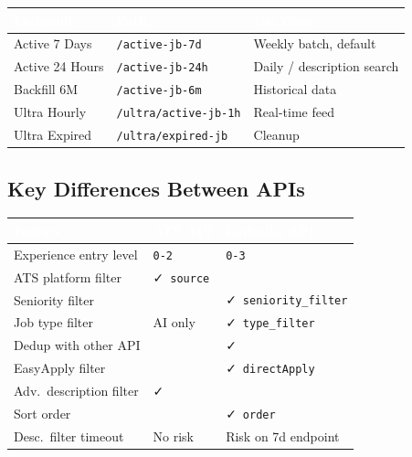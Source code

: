 \documentclass[11pt, a4paper]{article}
\newcommand{\cmark}{\textcolor{success}{\faCheck}}
\newcommand{\xmark}{\textcolor{highlight}{\faTimes}}
\begin{document}
\begin{center}\small
\begin{tabularx}{\textwidth}{|L{3cm}|L{4.5cm}|X|}
\hline
{}
\textcolor{white}{\textbf{Endpoint}} & \textcolor{white}{\textbf{Path}} & \textcolor{white}{\textbf{Use Case}} \\
\hline
Active 7 Days & \texttt{/active-jb-7d} & Weekly batch, default \\
Active 24 Hours & \texttt{/active-jb-24h} & Daily / description search \\
Backfill 6M & \texttt{/active-jb-6m} & Historical data \\
Ultra Hourly & \texttt{/ultra/active-jb-1h} & Real-time feed \\
Ultra Expired & \texttt{/ultra/expired-jb} & Cleanup \\
\hline
\end{tabularx}
\end{center}

\subsection{Key Differences Between APIs}

\begin{center}\small
\begin{tabularx}{\textwidth}{|L{3.8cm}|X|X|}
\hline
{}
\textcolor{white}{\textbf{Feature}} & \textcolor{white}{\textbf{ATS API}} & \textcolor{white}{\textbf{LinkedIn API}} \\
\hline
Experience entry level & \texttt{0-2} & \texttt{0-3} \\
ATS platform filter & \cmark~\texttt{source} & \xmark \\
Seniority filter & \xmark & \cmark~\texttt{seniority\_filter} \\
Job type filter & AI only & \cmark~\texttt{type\_filter} \\
Dedup with other API & \xmark & \cmark \\
EasyApply filter & \xmark & \cmark~\texttt{directApply} \\
Adv.\ description filter & \cmark & \xmark \\
Sort order & \xmark & \cmark~\texttt{order} \\
Desc.\ filter timeout & No risk & Risk on 7d endpoint \\
\hline
\end{tabularx}
\end{center}
\end{document}

